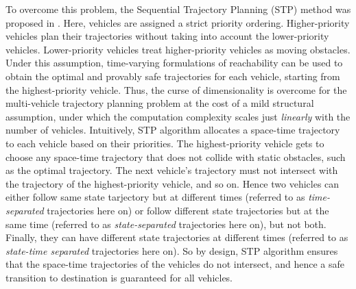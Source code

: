 To overcome this problem, the Sequential Trajectory Planning (STP) method was proposed in \cite{Chen15c}. Here, vehicles are assigned a strict priority ordering. Higher-priority vehicles plan their trajectories without taking into account the lower-priority vehicles. Lower-priority vehicles treat higher-priority vehicles as moving obstacles. Under this assumption, time-varying formulations of reachability \cite{Bokanowski11, Fisac15} can be used to obtain the optimal and provably safe trajectories for each vehicle, starting from the highest-priority vehicle. Thus, the curse of dimensionality is overcome for the multi-vehicle trajectory planning problem at the cost of a mild structural assumption, under which the computation complexity scales just \textit{linearly} with the number of vehicles. Intuitively, STP algorithm allocates a space-time trajectory to each vehicle based on their priorities. The highest-priority vehicle gets to choose any space-time trajectory that does not collide with static obstacles, such as the optimal trajectory. The next vehicle's trajectory must not intersect with the trajectory of the highest-priority vehicle, and so on. Hence two vehicles can either follow same state tarjectory but at different times (referred to as \textit{time-separated} trajectories here on) or follow different state trajectories but at the same time (referred to as \textit{state-separated} trajectories here on), but not both. Finally, they can have different state trajectories at different times (referred to as \textit{state-time separated} trajectories here on). So by design, STP algorithm ensures that the space-time trajectories of the vehicles do not intersect, and hence a safe transition to destination is guaranteed for all vehicles.  

